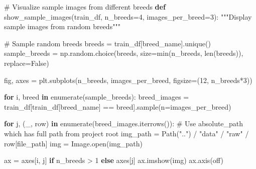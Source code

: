 \documentclass[
  letterpaper,
  DIV=11,
  numbers=noendperiod]{scrartcl}
\newenvironment{Shaded}{\begin{snugshade}}{\end{snugshade}}
\newcommand{\BuiltInTok}[1]{\textcolor[rgb]{0.00,0.23,0.31}{#1}}
\newcommand{\CommentTok}[1]{\textcolor[rgb]{0.37,0.37,0.37}{#1}}
\newcommand{\ControlFlowTok}[1]{\textcolor[rgb]{0.00,0.23,0.31}{\textbf{#1}}}
\newcommand{\DecValTok}[1]{\textcolor[rgb]{0.68,0.00,0.00}{#1}}
\newcommand{\KeywordTok}[1]{\textcolor[rgb]{0.00,0.23,0.31}{\textbf{#1}}}
\newcommand{\NormalTok}[1]{\textcolor[rgb]{0.00,0.23,0.31}{#1}}
\newcommand{\OperatorTok}[1]{\textcolor[rgb]{0.37,0.37,0.37}{#1}}
\newcommand{\StringTok}[1]{\textcolor[rgb]{0.13,0.47,0.30}{#1}}
\newcommand{\VariableTok}[1]{\textcolor[rgb]{0.07,0.07,0.07}{#1}}
\renewenvironment{Shaded}{%
  \begin{tcolorbox}[%
    enhanced,%
    colback=codebg,%
    colframe=codebg,%
    borderline west={3pt}{0pt}{sectionblue},%
    boxrule=0pt,%
    arc=0pt,%
    boxsep=5pt,%
    left=2mm,%
    right=2mm,%
    top=2mm,%
    bottom=2mm%
  ]%
}{%
  \end{tcolorbox}%
}
\begin{document}
\begin{Shaded}
\begin{Highlighting}[]
\CommentTok{\# Visualize sample images from different breeds}
\KeywordTok{def}\NormalTok{ show\_sample\_images(train\_df, n\_breeds}\OperatorTok{=}\DecValTok{4}\NormalTok{, images\_per\_breed}\OperatorTok{=}\DecValTok{3}\NormalTok{):}
    \CommentTok{"""Display sample images from random breeds"""}
    
    \CommentTok{\# Sample random breeds}
\NormalTok{    breeds }\OperatorTok{=}\NormalTok{ train\_df[}\StringTok{\textquotesingle{}breed\_name\textquotesingle{}}\NormalTok{].unique()}
\NormalTok{    sample\_breeds }\OperatorTok{=}\NormalTok{ np.random.choice(breeds, }
\NormalTok{                                     size}\OperatorTok{=}\BuiltInTok{min}\NormalTok{(n\_breeds, }\BuiltInTok{len}\NormalTok{(breeds)), replace}\OperatorTok{=}\VariableTok{False}\NormalTok{)}
    
\NormalTok{    fig, axes }\OperatorTok{=}\NormalTok{ plt.subplots(n\_breeds, images\_per\_breed, figsize}\OperatorTok{=}\NormalTok{(}\DecValTok{12}\NormalTok{, n\_breeds}\OperatorTok{*}\DecValTok{3}\NormalTok{))}
    
    \ControlFlowTok{for}\NormalTok{ i, breed }\KeywordTok{in} \BuiltInTok{enumerate}\NormalTok{(sample\_breeds):}
\NormalTok{        breed\_images }\OperatorTok{=}\NormalTok{ train\_df[train\_df[}\StringTok{\textquotesingle{}breed\_name\textquotesingle{}}\NormalTok{] }
                                \OperatorTok{==}\NormalTok{ breed].sample(n}\OperatorTok{=}\NormalTok{images\_per\_breed)}
        
        \ControlFlowTok{for}\NormalTok{ j, (\_, row) }\KeywordTok{in} \BuiltInTok{enumerate}\NormalTok{(breed\_images.iterrows()):}
            \CommentTok{\# Use absolute\_path which has full path from project root}
\NormalTok{            img\_path }\OperatorTok{=}\NormalTok{ Path(}\StringTok{".."}\NormalTok{) }\OperatorTok{/} \StringTok{"data"} \OperatorTok{/} \StringTok{"raw"} \OperatorTok{/}\NormalTok{ row[}\StringTok{\textquotesingle{}file\_path\textquotesingle{}}\NormalTok{]}
\NormalTok{            img }\OperatorTok{=}\NormalTok{ Image.}\BuiltInTok{open}\NormalTok{(img\_path)}
            
\NormalTok{            ax }\OperatorTok{=}\NormalTok{ axes[i, j] }\ControlFlowTok{if}\NormalTok{ n\_breeds }\OperatorTok{\textgreater{}} \DecValTok{1} \ControlFlowTok{else}\NormalTok{ axes[j]}
\NormalTok{            ax.imshow(img)}
\NormalTok{            ax.axis(}\StringTok{\textquotesingle{}off\textquotesingle{}}\NormalTok{)}
            

\end{Highlighting}
\end{Shaded}
\end{document}
